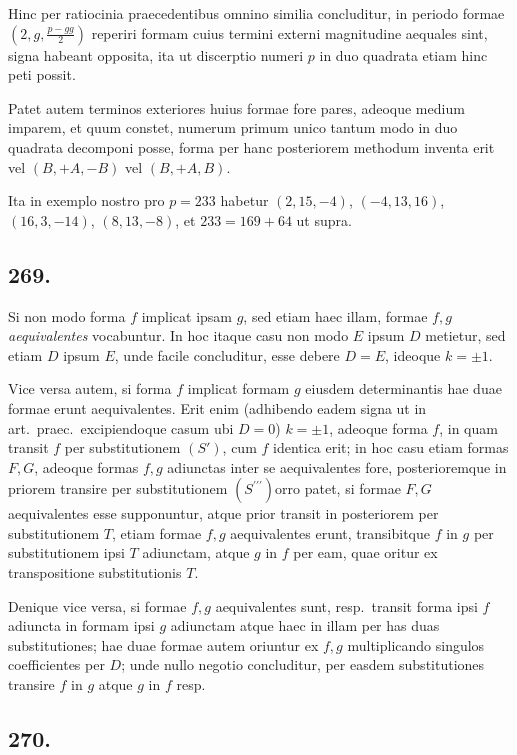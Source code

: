 \documentclass[12pt,a4paper]{article}
\theoremstyle{plain}
\theoremstyle{definition}
\theoremstyle{remark}
\begin{document}
Hinc per ratiocinia praecedentibus omnino similia concluditur, in periodo formae $(2,g,\frac{p-gg}{2})$ reperiri formam cuius termini externi magnitudine aequales sint, signa habeant opposita, ita ut discerptio numeri $p$ in duo quadrata etiam hinc peti possit.

Patet autem terminos exteriores huius formae fore pares, adeoque medium imparem, et quum constet, numerum primum unico tantum modo in duo quadrata decomponi posse, forma per hanc posteriorem methodum inventa erit vel $(B,+A,-B)$ vel $(B,+A,B)$.

Ita in exemplo nostro pro $p = 233$ habetur $(2,15,-4)$, $(-4,13,16)$, $(16,3,-14)$, $(8,13,-8)$, et $233 = 169+64$ ut supra.

\subsection*{269.}

Si non modo forma $f$ implicat ipsam $g$, sed etiam haec illam, formae $f, g$ \emph{aequivalentes} vocabuntur. In hoc itaque casu non modo $E$ ipsum $D$ metietur, sed etiam $D$ ipsum $E$, unde facile concluditur, esse debere $D = E$, ideoque $k = \pm 1$.

Vice versa autem, si forma $f$ implicat formam $g$ eiusdem determinantis hae duae formae erunt aequivalentes. Erit enim (adhibendo eadem signa ut in art.\ praec.\ excipiendoque casum ubi $D = 0$) $k = \pm 1$, adeoque forma $f$, in quam transit $f$ per substitutionem $(S')$, cum $f$ identica erit; in hoc casu etiam formas $F, G$, adeoque formas $f, g$ adiunctas inter se aequivalentes fore, posterioremque in priorem transire per substitutionem $(S^{\prime\prime\prime})$orro patet, si formae $F, G$ aequivalentes esse supponuntur, atque prior transit in posteriorem per substitutionem $T$, etiam formae $f, g$ aequivalentes erunt, transibitque $f$ in $g$ per substitutionem ipsi $T$ adiunctam, atque $g$ in $f$ per eam, quae oritur ex transpositione substitutionis $T$.

Denique vice versa, si formae $f, g$ aequivalentes sunt, resp.\ transit forma ipsi $f$ adiuncta in formam ipsi $g$ adiunctam atque haec in illam per has duas substitutiones; hae duae formae autem oriuntur ex $f, g$ multiplicando singulos coefficientes per $D$; unde nullo negotio concluditur, per easdem substitutiones transire $f$ in $g$ atque $g$ in $f$ resp.

\subsection*{270.}
\end{document}
